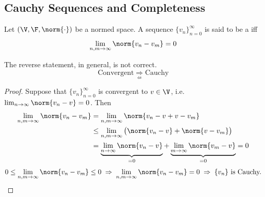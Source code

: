 \subsection{Cauchy Sequences and Completeness}\label{ss:cauchy}
\begin{definition}
Let $(\V,\F,\norm{\cdot})$ be a normed space. A sequence $\{v_n\}_{n=0}^\infty$ is said to be a  iff
\[
\lim_{n,m\to\infty}\norm{v_n - v_m} = 0
\]
\end{definition}
\begin{claim}
 The reverse statement, in general, is not correct.
\[
\text{Convergent} \;\underset{\not\Leftarrow}{\Rightarrow}\; \text{Cauchy}
\]
\end{claim}
\begin{proof}
Suppose that $\{v_n\}_{n=0}^\infty$ is convergent to $v\in\V$, i.e.\ $\lim_{n\to\infty}\norm{v_n - v} = 0$. Then
\begin{align*}
\lim_{n,m\to\infty}\norm{v_n - v_m} &= \lim_{n,m\to\infty}\norm{v_n - v + v - v_m}\\
&\le \lim_{n,m\to\infty} \big(\norm{v_n - v} + \norm{v - v_m}\big)\\
&= \underbrace{\lim_{n\to\infty}\norm{v_n - v}}_{=0} + \underbrace{\lim_{m\to\infty}\norm{v_m - v}}_{=0} = 0
\end{align*}
\[
0 \le \lim_{n,m\to\infty}\norm{v_n - v_m} \le 0 \;\Rightarrow\; \lim_{n,m\to\infty}\norm{v_n - v_m} = 0 \;\Rightarrow\; \{v_n\} \text{ is Cauchy.}
\qedhere
\]
\end{proof}

